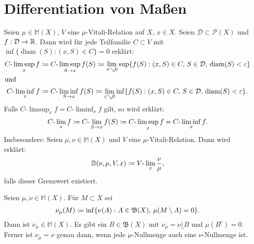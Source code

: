 \documentclass[a4paper,twoside,DIV15,BCOR12mm]{scrbook}
\newcommand{\borel}{\mathfrak B}
\DeclareMathOperator{\diam}{diam}
\newcommand{\MR}{\lfloor}
\begin{document}
\section{Differentiation von Maßen}

\begin{definition}
Seien $\mu\in\mathbb{M} (X)$, $V$ eine $\mu$-Vitali-Relation auf $X$, $x\in X$. Seien $\mathcal{D}\subset \mathcal P(X)$ und $f:\mathcal D\to \mathbb{R}$. Dann wird für jede Teilfamilie $C\subset V$ mit $\inf\{\diam(S): (x,S)\in C\}=0$ erklärt:
\begin{align*}
C\text{-}\limsup_x f &\da C\text{-}\limsup_{S\to x} f(S) \da
\lim_{x\searrow 0} \sup\{f(S):(x,S)\in C,\, S\in\mathcal D,\, \diam(S)<\ep\}\\
\intertext{und}
C\text{-}\liminf_x f &\da C\text{-}\liminf_{S\to x} f(S) \da
\lim_{\ep \searrow0} \inf\{f(S):(x,S)\in C,\, S\in\mathcal D,\, \diam(S)<\ep\}.
\end{align*}
Falls $C\text{-}\limsup_x f = C\text{-}\liminf_x f$ gilt, so wird erklärt:
\begin{align*}
C\text{-}\lim_x f \da C\text{-}\lim_{S\to x} f(S)\da C\text{-}\limsup_x f = C\text{-}\liminf_x f.
\end{align*}
Insbesondere: Seien $\mu,\nu\in\mathbb M(X)$ und $V$ eine $\mu$-Vitali-Relation. Dann wird erklärt:
\begin{align*}
\mathbb D(\nu,\mu,V,x) \da V\text{-}\lim_x \frac\nu\mu,
\end{align*}
falls dieser Grenzwert existiert.
\end{definition}

\begin{satz}
\label{satz:2.10}
Seien $\mu,\nu\in\mathbb{M}(X)$. Für $M\subset X$ sei
\begin{align*}
\nu_\mu(M) \da \inf\{\nu(A) : A\in \borel(X),\, \mu(M\setminus A) =0 \}.
\end{align*}
Dann ist $\nu_\mu\in\mathbb{M} (X)$. Es gibt ein $B\in\borel(X)$ mit $\nu_\mu = \nu\MR B$ und $\mu(B^c) = 0$. Ferner ist $\nu_\mu=\nu$ genau dann, wenn jede $\mu$-Nullmenge auch eine $\nu$-Nullmenge ist.
\end{satz}
\end{document}
